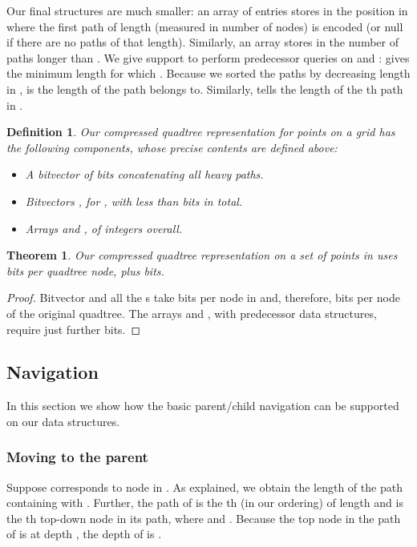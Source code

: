 \documentclass{elsarticle}
\newtheorem{theorem}{Theorem}
\newtheorem{definition}{Definition}
\begin{document}
Our final structures are much smaller: an array  of  entries stores in  the position in  where the first  path of length  (measured in number of nodes) is encoded (or null if there are no  paths of that length). Similarly, an array  stores in  the number of paths longer than . We give support to perform predecessor queries on  and :  gives the minimum length  for which . Because we sorted the  paths by decreasing length in ,  is the length of the  path  belongs to. Similarly,  tells the length  of the th path in .

\begin{definition}
Our compressed quadtree representation for  points on a  grid 
has the following components, whose precise contents are defined above:
\begin{itemize}
\item A bitvector  of  bits concatenating all heavy paths.
\item Bitvectors , for , with less than  bits in total.
\item Arrays  and , of  integers overall.
\end{itemize}
\end{definition}

\begin{theorem}
Our compressed quadtree representation on a set of points in  uses  bits per quadtree node, plus  bits.
\end{theorem}
\begin{proof}
Bitvector  and all the s take  bits per node in  and, therefore,  bits per node of the original quadtree. The arrays  and , with predecessor data structures, require just  further bits.
\end{proof}

\subsection{Navigation}
\label{sec:nav}

In this section we show how the basic parent/child navigation can be supported on our data structures.

\subsubsection{Moving to the parent}
Suppose  corresponds to node  in . As explained, we obtain the length  of the path containing  with . Further, the path of  is the th (in our ordering) of length  and  is the th top-down node in its path, where  and . Because the top node in the path of  is at depth , the depth of  is .
\end{document}
